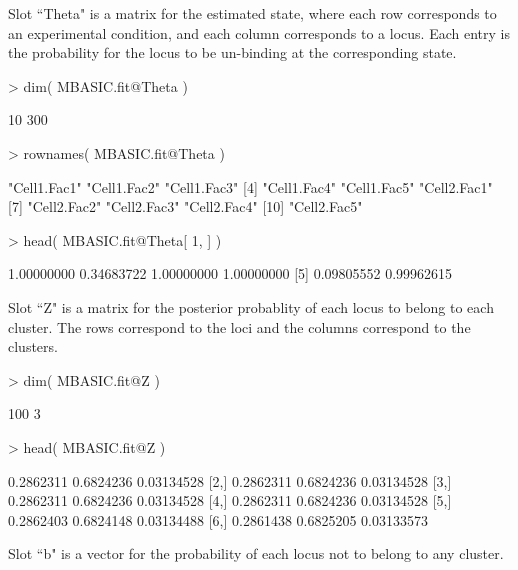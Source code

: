 \documentclass[a4paper,10pt]{article}
\begin{document}
Slot ``Theta" is a matrix for the estimated state, where each row corresponds to an experimental condition, and each column corresponds to a locus. Each entry is the probability for the locus to be un-binding at the corresponding state.

\begin{Schunk}
\begin{Sinput}
> dim( MBASIC.fit@Theta )
\end{Sinput}
\begin{Soutput}
[1]  10 300
\end{Soutput}
\begin{Sinput}
> rownames( MBASIC.fit@Theta )
\end{Sinput}
\begin{Soutput}
 [1] "Cell1.Fac1" "Cell1.Fac2" "Cell1.Fac3"
 [4] "Cell1.Fac4" "Cell1.Fac5" "Cell2.Fac1"
 [7] "Cell2.Fac2" "Cell2.Fac3" "Cell2.Fac4"
[10] "Cell2.Fac5"
\end{Soutput}
\begin{Sinput}
> head( MBASIC.fit@Theta[ 1, ] )
\end{Sinput}
\begin{Soutput}
[1] 1.00000000 0.34683722 1.00000000 1.00000000
[5] 0.09805552 0.99962615
\end{Soutput}
\end{Schunk}

Slot ``Z" is a matrix for the posterior probablity of each locus to belong to each cluster. The rows correspond to the loci and the columns correspond to the clusters.

\begin{Schunk}
\begin{Sinput}
> dim( MBASIC.fit@Z )
\end{Sinput}
\begin{Soutput}
[1] 100   3
\end{Soutput}
\begin{Sinput}
> head( MBASIC.fit@Z )
\end{Sinput}
\begin{Soutput}
          [,1]      [,2]       [,3]
[1,] 0.2862311 0.6824236 0.03134528
[2,] 0.2862311 0.6824236 0.03134528
[3,] 0.2862311 0.6824236 0.03134528
[4,] 0.2862311 0.6824236 0.03134528
[5,] 0.2862403 0.6824148 0.03134488
[6,] 0.2861438 0.6825205 0.03133573
\end{Soutput}
\end{Schunk}

Slot ``b" is a vector for the probability of each locus not to belong to any cluster. 
\end{document}
